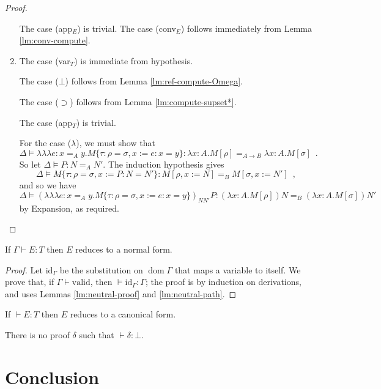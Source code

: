 \documentclass[a4paper,UKenglish]{lipics-v2016}
\newcommand*{\triplelambda}{\ensuremath{\lambda \!\! \lambda \!\! \lambda}}
\newcommand*{\vald}{\ensuremath{\vdash \mathrm{valid}}}
\newcommand*{\dom}{\ensuremath{\operatorname{dom}}}
\theoremstyle{plain}
\theoremstyle{definition}
\begin{document}
\begin{proof}
\begin{enumerate}
The case (app$_E$) is trivial.  The case (conv$_E$) follows immediately from Lemma \ref{lm:conv-compute}.
\item
The case (var$_T$) is immediate from hypothesis.

The case ($\bot$) follows from Lemma \ref{lm:ref-compute-Omega}.

The case ($\supset$) follows from Lemma \ref{lm:compute-supset*}.

The case (app$_T$) is trivial.

For the case ($\lambda$), we must show that
\[ \Delta \models \triplelambda e : x =_A y. M \{ \tau : \rho = \sigma, x := e : x = y \} : \lambda x:A.M [ \rho ] =_{A \rightarrow B} \lambda x:A.M [ \sigma ] \enspace . \]
So let $\Delta \models P : N =_A N'$.  The induction hypothesis gives
\[ \Delta \models M \{ \tau : \rho = \sigma, x := P : N = N' \} : M [\rho, x := N] =_B M [\sigma, x := N'] \enspace , \]
and so we have
\[ \Delta \models (\triplelambda e : x =_A y. M \{ \tau : \rho = \sigma, x := e : x = y \})_{N N'} P : (\lambda x:A.M [ \rho ])N =_B (\lambda x:A.M [ \sigma ])N'\]
by Expansion, as required.
\end{enumerate}
\end{proof}

\begin{corollary}
If $\Gamma \vdash E : T$ then $E$ reduces to a normal form.
\end{corollary}

\begin{proof}
Let $\mathrm{id}_\Gamma$ be the substitution on $\dom \Gamma$ that maps a variable to itself.
We prove that, if $\Gamma \vald$, then $\models \mathrm{id}_\Gamma : \Gamma$; the proof is by induction on derivations, and uses Lemmas \ref{lm:neutral-proof} and \ref{lm:neutral-path}.
\end{proof}

\begin{corollary}[Canonicity]
If $\vdash E : T$ then $E$ reduces to a canonical form.
\end{corollary}

\begin{corollary}[Consistency]
There is no proof $\delta$ such that $\vdash \delta : \bot$.
\end{corollary}

\section{Conclusion}
\end{document}
